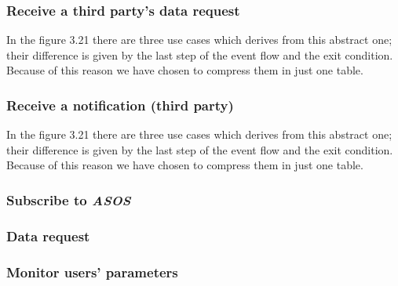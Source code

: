 \subsubsection{Receive a third party's data request}
In the figure 3.21 there are three use cases which derives from this abstract one; their difference is given by the last step of the event flow and the exit condition. Because of this reason we have chosen to compress them in just one table.


\subsubsection{Receive a notification (third party)}
In the figure 3.21 there are three use cases which derives from this abstract one; their difference is given by the last step of the event flow and the exit condition. Because of this reason we have chosen to compress them in just one table.


\subsubsection{Subscribe to \textit{ASOS}}


\subsubsection{Data request}


\subsubsection{Monitor users' parameters}
